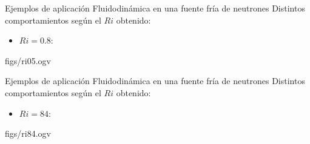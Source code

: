 \begin{frame}
{Ejemplos de aplicación}
{Fluidodinámica en una fuente fría de neutrones}
Distintos comportamientos según el $Ri$ obtenido:
\begin{itemize}
\item $Ri=0.8$:
\end {itemize}

\begin{center}
%
{figs/ri05.ogv} %
\end{center}

\end{frame}


\begin{frame}
{Ejemplos de aplicación}
{Fluidodinámica en una fuente fría de neutrones}
Distintos comportamientos según el $Ri$ obtenido:
\begin{itemize}
\item $Ri=84$:
\end {itemize}

\begin{center}
%
{figs/ri84.ogv} %
\end{center}

\end{frame}




